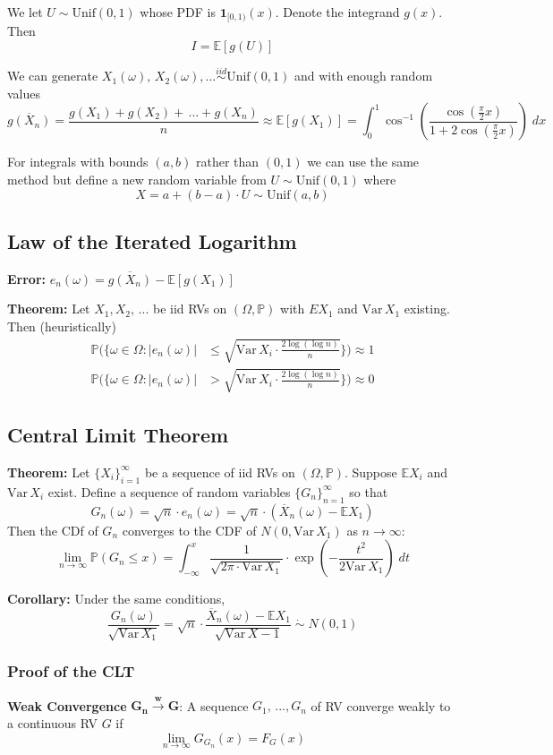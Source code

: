 \documentclass[12pt]{article}
\renewcommand{\P}{\mathbb{P}}
\newcommand{\E}{\mathbb{E}}
\newcommand{\Var}{\text{Var}\,}
\begin{document}
We let $U \sim \text{Unif}(0, 1)$ whose PDF is $\mathbf{1}_{[0, 1)}(x)$. Denote the integrand $g(x)$. Then
\[I = \E[g(U)]\]

We can generate $X_1(\omega),\, X_2(\omega), ... \overset{iid}{\sim} \text{Unif}(0, 1)$ and with enough random values 
\[\overline{g(X_n)} = \frac{g(X_1) + g(X_2) + \, ... + g(X_n)}{n} \approx \E[g(X_1)] = \int_0^1 \cos^{-1}\left(\frac{\cos(\frac{\pi}{2}x)}{1 + 2\cos(\frac{\pi}{2}x)}\right)\; dx\]

For integrals with bounds $(a, b)$ rather than $(0, 1)$ we can use the same method but define a new random variable from $U \sim \text{Unif}(0, 1)$ where 
\[X = a + (b - a) \cdot U \sim \text{Unif}(a, b)\]

\subsection{Law of the Iterated Logarithm}
\textbf{Error:} $e_n(\omega) = \overline{g(X_n)} - \E[g(X_1)]$

\textbf{Theorem:} Let $X_1, X_2, \, ...$ be iid RVs on $(\Omega, \P)$ with $E X_1$ and $\Var X_1$ existing. Then (heuristically) 
\begin{align*}
    \P(\{\omega \in \Omega: |e_n(\omega)| &\leq \sqrt{\Var X_i \cdot \frac{2\log(\log n)}{n}}\}) \approx 1\\
    \P(\{\omega \in \Omega: |e_n(\omega)| &> \sqrt{\Var X_i \cdot \frac{2\log(\log n)}{n}}\}) \approx 0
\end{align*}

\subsection{Central Limit Theorem}
\textbf{Theorem:} Let $\{X_i\}_{i=1}^\infty$ be a sequence of iid RVs on $(\Omega, \P)$. Suppose $\E X_i$ and $\Var X_i$ exist. Define a sequence of random variables $\{G_n\}_{n=1}^\infty$ so that 
\[G_n(\omega) = \sqrt{n} \cdot e_n(\omega) = \sqrt{n} \cdot (\overline X_n(\omega) - \E X_1)\]
Then the CDf of $G_n$ converges to the CDF of $N(0, \Var X_1)$ as $n \to \infty$:
\[\lim_{n \to \infty} \P(G_n \leq x) = \int_{-\infty}^x \frac{1}{\sqrt{2\pi \cdot \Var X_1}} \cdot \exp\left(-\frac{t^2}{2\Var X_1}\right)\; dt\]

\textbf{Corollary:} Under the same conditions,
\[\frac{G_n(\omega)}{\sqrt{\Var X_1}} = \sqrt{n} \cdot \frac{\overline X_n(\omega) - \E X_1}{\sqrt{\Var X-1}} \; \dot \sim \; N(0, 1)\]

\subsubsection*{Proof of the CLT}
\textbf{Weak Convergence} $\mathbf{G_n \overset{w}{\to} G}$: A sequence $G_1, \, ..., G_n$ of RV converge weakly to a continuous RV $G$ if 
\[\lim_{n \to \infty} G_{G_n}(x) = F_G(x)\]
\end{document}

